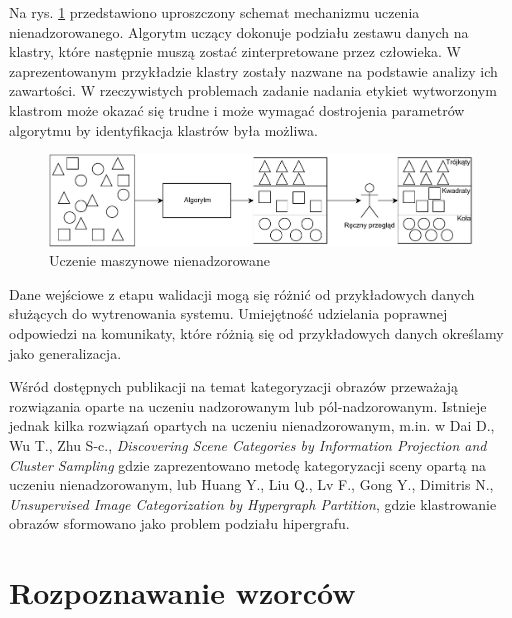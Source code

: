 Na rys. \ref{fig:unsupervised-learning} przedstawiono uproszczony schemat mechanizmu uczenia nienadzorowanego. Algorytm uczący dokonuje podziału zestawu danych na klastry, które następnie muszą zostać zinterpretowane przez człowieka. W zaprezentowanym przykładzie klastry zostały nazwane na podstawie analizy ich zawartości. W rzeczywistych problemach zadanie nadania etykiet wytworzonym klastrom może okazać się trudne i może wymagać dostrojenia parametrów algorytmu by identyfikacja klastrów była możliwa.

\begin{figure}[h]
	\centering
	\includegraphics[scale=0.8]{graphics/01_podstawy_teoretyczne/unsupervised-learning.pdf}
	\caption{Uczenie maszynowe nienadzorowane \cite{CASEY}}
	\label{fig:unsupervised-learning}
\end{figure}

Dane wejściowe z etapu walidacji mogą się różnić od przykładowych danych służących do wytrenowania systemu. Umiejętność udzielania poprawnej odpowiedzi na komunikaty, które różnią się od przykładowych danych określamy jako generalizacja.\cite{BISHOP06}

Wśród dostępnych publikacji na temat kategoryzacji obrazów przeważają rozwiązania oparte na uczeniu nadzorowanym lub pól-nadzorowanym.\cite{MELE06}\cite{CHEN04}\cite{Vitaladevuni13}\cite{LUO11} Istnieje jednak kilka rozwiązań opartych na uczeniu nienadzorowanym, m.in. w  Dai D., Wu T., Zhu S-c., \emph{Discovering Scene Categories by Information Projection and Cluster Sampling}\cite{DAI10} gdzie zaprezentowano metodę kategoryzacji sceny opartą na uczeniu nienadzorowanym, lub Huang Y., Liu Q., Lv F., Gong Y., Dimitris N., \emph{Unsupervised Image Categorization by Hypergraph Partition}\cite{HUANG11}, gdzie klastrowanie obrazów sformowano jako problem podziału hipergrafu.

\section{Rozpoznawanie wzorców}


